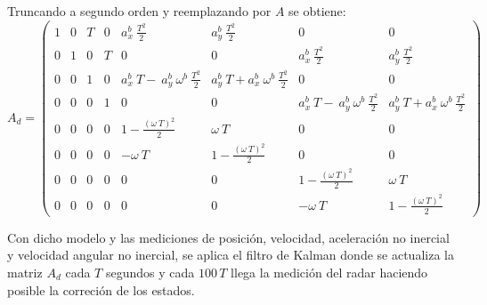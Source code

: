 	Truncando a segundo orden y reemplazando por $A$ se obtiene:
		\begin{equation*}
			A_d = \begin{pmatrix}	1&0&T&0&a^b_x\:\frac{T^2}{2}&a^b_y\:\frac{T^2}{2}&0&0\\[0.3em]%
						0&1&0&T&0&0&a^b_x\:\frac{T^2}{2}&a^b_y\:\frac{T^2}{2}\\[0.3em]%
						0&0&1&0&a^b_x\:T-\:a^b_y\:\omega^b\:\frac{T^2}{2}&a^b_y\: T+a^b_x\:\omega^b\:\frac{T^2}{2}&0&0\\[0.3em]%
						0&0&0&1&0&0&a^b_x\:T-\:a^b_y\:\omega^b\:\frac{T^2}{2}&a^b_y\: T+a^b_x\:\omega^b\:\frac{T^2}{2}\\[0.3em]%
						0&0&0&0&1-\frac{(\omega\:T)^2}{2}&\omega\:T&0&0\\[0.3em]%
						0&0&0&0&-\omega\:T&1-\frac{(\omega\:T)^2}{2}&0&0\\[0.3em]%
						0&0&0&0&0&0&1-\frac{(\omega\:T)^2}{2}&\omega\:T\\[0.3em]%
						0&0&0&0&0&0&-\omega\:T&1-\frac{(\omega\:T)^2}{2}
		\end{pmatrix}
		\end{equation*}


		Con dicho modelo y las mediciones de posición, velocidad, aceleración no inercial y velocidad angular no inercial, se aplica el filtro de Kalman donde se actualiza la matriz $A_d$ cada $T$ segundos y cada $100\, T$ llega la medición del radar haciendo posible la correción de los estados.
	
%
%	

